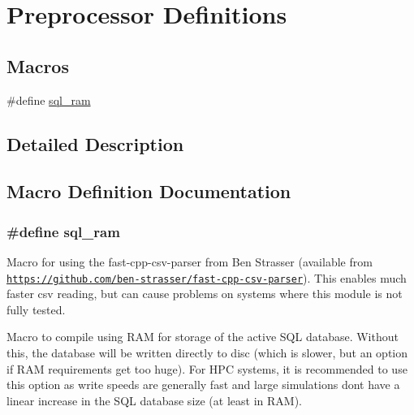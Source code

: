 \hypertarget{group___d_e_f_i_n_e_s}{}\section{Preprocessor Definitions}
\label{group___d_e_f_i_n_e_s}
\subsection*{Macros}
\begin{DoxyCompactItemize}
\item 
\#define \hyperlink{group___d_e_f_i_n_e_s_ga063c2e626b5c0dcf65522d05574349a6}{sql\+\_\+ram}
\end{DoxyCompactItemize}


\subsection{Detailed Description}


\subsection{Macro Definition Documentation}
\subsubsection[{\texorpdfstring{sql\+\_\+ram}{sql_ram}}]{\setlength{\rightskip}{0pt plus 5cm}\#define sql\+\_\+ram}\hypertarget{group___d_e_f_i_n_e_s_ga063c2e626b5c0dcf65522d05574349a6}{}\label{group___d_e_f_i_n_e_s_ga063c2e626b5c0dcf65522d05574349a6}
Macro for using the fast-\/cpp-\/csv-\/parser from Ben Strasser (available from \href{https://github.com/ben-strasser/fast-cpp-csv-parser}{\tt https\+://github.\+com/ben-\/strasser/fast-\/cpp-\/csv-\/parser}). This enables much faster csv reading, but can cause problems on systems where this module is not fully tested.

Macro to compile using R\+AM for storage of the active S\+QL database. Without this, the database will be written directly to disc (which is slower, but an option if R\+AM requirements get too huge). For H\+PC systems, it is recommended to use this option as write speeds are generally fast and large simulations don\textquotesingle{}t have a linear increase in the S\+QL database size (at least in R\+AM). 